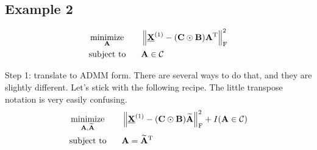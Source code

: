 \documentclass[11pt,a4paper]{article}
\newcommand{\norm}[1]{\left\lVert#1\right\rVert}
\DeclareMathOperator*{\minimize}{minimize}
\theoremstyle{plain}
\theoremstyle{definition}
\theoremstyle{remark}
\begin{document}
\subsection{Example 2}%
\label{sub:example_2}
\begin{alignat*}{2}
    & \minimize_{\mathbf{A}} \quad && \norm{\underline{\mathbf{X}}^{(1)} - (\mathbf{C} \odot \mathbf{B})\mathbf{A}^{\rm T} }_{\rm F}^2 \\
    & \text{subject to} && \mathbf{A} \in \mathcal{C}
\end{alignat*}

Step 1: translate to ADMM form. There are several ways to do that, and they are slightly different. Let's stick with the following recipe. The little transpose notation is very easily confusing.
\begin{alignat*}{2}
    & \minimize_{\mathbf{A}, \widetilde{\mathbf{A}}} \quad && \norm{\underline{\mathbf{X}}^{(1)} - (\mathbf{C} \odot \mathbf{B})\widetilde{\mathbf{A}}}_{\rm F}^2 + I(\mathbf{A} \in \mathcal{C}) \\
    & \text{subject to} && \mathbf{A} = \widetilde{\mathbf{A}}^{\rm T} 
\end{alignat*}
\end{document}
